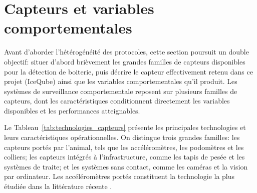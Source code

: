 \section{Capteurs et variables comportementales}
\label{sec:technologies_capteurs}

Avant d'aborder l'hétérogénéité des protocoles, cette section poursuit un double objectif:
situer d'abord brièvement les grandes familles de capteurs disponibles pour la détection
de boiterie, puis décrire le capteur effectivement retenu dans ce projet (IceQube) ainsi
que les variables comportementales qu'il produit. Les systèmes de surveillance
comportementale reposent sur plusieurs familles de capteurs, dont les caractéristiques
conditionnent directement les variables disponibles et les performances atteignables.

Le Tableau~\ref{tab:technologies_capteurs} présente les principales technologies et leurs
caractéristiques opérationnelles. On distingue trois grandes familles: les capteurs portés
par l'animal, tels que les accéléromètres, les podomètres et les colliers; les capteurs
intégrés à l'infrastructure, comme les tapis de pesée et les systèmes de traite; et les
systèmes sans contact, comme les caméras et la vision par ordinateur. Les accéléromètres
portés constituent la technologie la plus étudiée dans la littérature récente
\citep{oleary2020accelerometers,alsaaod2019automatic}.

